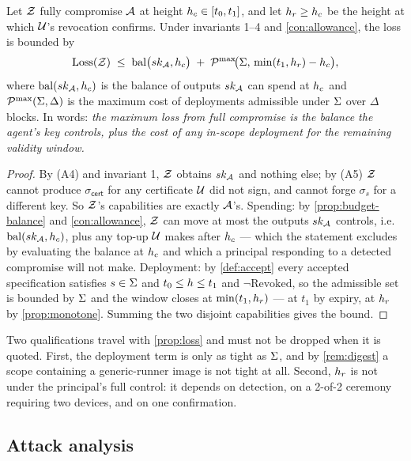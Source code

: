 \begin{proposition}
\label{prop:loss}
Let $\mathcal{Z}$ fully compromise $\mathcal{A}$ at height $h_c \in [t_0,t_1]$, and let $h_r \ge h_c$ be
the height at which $\mathcal{U}$'s revocation confirms. Under invariants 1--4 and
\cref{con:allowance}, the loss is bounded by
\[
  \mathrm{Loss}(\mathcal{Z}) \;\le\;
  \mathrm{bal}\bigl(sk_{\mathcal{A}}, h_c\bigr) \;+\;
  \mathcal{P}^{\max}\!\bigl(\Sigma,\, \min(t_1,h_r) - h_c\bigr),
\]
where $\mathrm{bal}(sk_{\mathcal{A}},h_c)$ is the balance of outputs $sk_{\mathcal{A}}$ can spend at
$h_c$ and $\mathcal{P}^{\max}(\Sigma,\Delta)$ is the maximum cost of deployments admissible under
$\Sigma$ over $\Delta$ blocks. In words: \emph{the maximum loss from full compromise is the
balance the agent's key controls, plus the cost of any in-scope deployment for the remaining validity
window.}
\end{proposition}

\begin{proof}
By (A4) and invariant 1, $\mathcal{Z}$ obtains $sk_{\mathcal{A}}$ and nothing else; by (A5) $\mathcal{Z}$ cannot produce
$\sigma_{\mathsf{cert}}$ for any certificate $\mathcal{U}$ did not sign, and cannot forge
$\sigma_s$ for a different key. So $\mathcal{Z}$'s capabilities are exactly $\mathcal{A}$'s. Spending: by
\cref{prop:budget-balance} and \cref{con:allowance}, $\mathcal{Z}$ can move at most the outputs
$sk_{\mathcal{A}}$ controls, i.e. $\mathrm{bal}(sk_{\mathcal{A}},h_c)$, plus any top-up $\mathcal{U}$ makes after
$h_c$ --- which the statement excludes by evaluating the balance at $h_c$ and which a principal
responding to a detected compromise will not make. Deployment: by \cref{def:accept} every accepted
specification satisfies $s \in \Sigma$ and $t_0 \le h \le t_1$ and
$\neg\mathrm{Revoked}$, so the admissible set is bounded by $\Sigma$ and the window closes at
$\min(t_1,h_r)$ --- at $t_1$ by expiry, at $h_r$ by \cref{prop:monotone}. Summing the two
disjoint capabilities gives the bound. \qedhere
\end{proof}

Two qualifications travel with \cref{prop:loss} and must not be dropped when it is quoted. First, the
deployment term is only as tight as $\Sigma$, and by \cref{rem:digest} a scope containing a
generic-runner image is not tight at all. Second, $h_r$ is not under the principal's full control:
it depends on detection, on a 2-of-2 ceremony requiring two devices, and on one confirmation.

\subsection{Attack analysis}
\label{sec:agent-identity:attacks}

